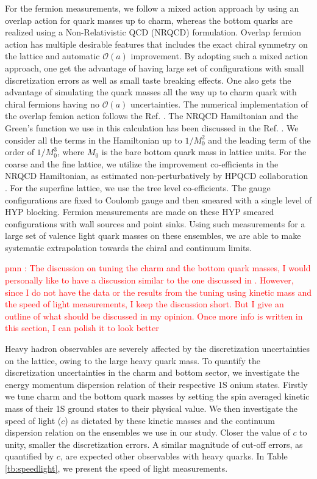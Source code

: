 \documentclass[showkeys,aps,10pt,twocolumn,showpacs,preprintnumbers,amsmath,amssymb,prd,letterpaper,floatfix,nofootinbib,superscriptaddress,]{revtex4-1}
\newcommand\tbn[1]{Table \ref{tb:#1}}
\newcommand\pmn[1]{\textcolor{red}{pmn : #1}}
\begin{document}
For the fermion measurements, we follow a mixed action approach by using an overlap action for quark 
masses up to charm, whereas the bottom quarks are realized using a Non-Relativistic QCD (NRQCD) formulation. 
Overlap fermion action has multiple desirable features that includes the exact chiral symmetry on the 
lattice and automatic $\mathcal{O}(a)$ improvement. By adopting such a mixed action approach, one get 
the advantage of having large set of configurations with small discretization errors as well as small 
taste breaking effects. One also gets the advantage of simulating the quark masses all the way up to 
charm quark with chiral fermions having no $\mathcal{O}(a)$ uncertainties. The numerical implementation 
of the overlap femion action follows the Ref. \cite{}. The NRQCD Hamiltonian and the Green's function 
we use in this calculation has been discussed in the Ref. \cite{}. We consider all the terms in the 
Hamiltonian up to $1/M_0^2$ and the leading term of the order of $1/M_0^3$, where $M_0$ is the bare 
bottom quark mass in lattice units. For the coarse and the fine lattice, we utilize the improvement 
co-efficients in the NRQCD Hamiltonian, as estimated non-perturbatively by HPQCD collaboration \cite{}. 
For the superfine lattice, we use the tree level co-efficients. The gauge configurations are fixed 
to Coulomb gauge and then smeared with a single level of HYP blocking. Fermion measurements are made
on these HYP smeared configurations with wall sources and point sinks. Using such measurements for a 
large set of valence light quark masses on these ensembles, we are able to make systematic extrapolation 
towards the chiral and continuum limits. 

\pmn{The discussion on tuning the charm and the bottom quark masses, I would personally like to have a 
discussion similar to the one discussed in \cite{Meinel:2010pv}. However, since I do not have the data 
or the results from the tuning using kinetic mass and the speed of light measurements, I keep the 
discussion short. But I give an outline of what should be discussed in my opinion. Once more info is 
written in this section, I can polish it to look better}

Heavy hadron observables are severely affected by the discretization uncertainties on the lattice, owing 
to the large heavy quark mass. To quantify the discretization uncertainties in the charm and bottom sector, 
we investigate the energy momentum dispersion relation of their respective 1S onium states. Firstly we tune 
charm and the bottom quark masses by setting the spin averaged kinetic mass of their 1S ground states 
to their physical value. We then investigate the speed of light ($c$) as dictated by these kinetic masses and 
the continuum dispersion relation on the ensembles we use in our study. Closer the value of $c$ to unity, 
smaller the discretization errors. A similar magnitude of cut-off errors, as quantified by $c$, are expected 
other observables with heavy quarks. In \tbn{speedlight}, we present the speed of light measurements. 
\end{document}
